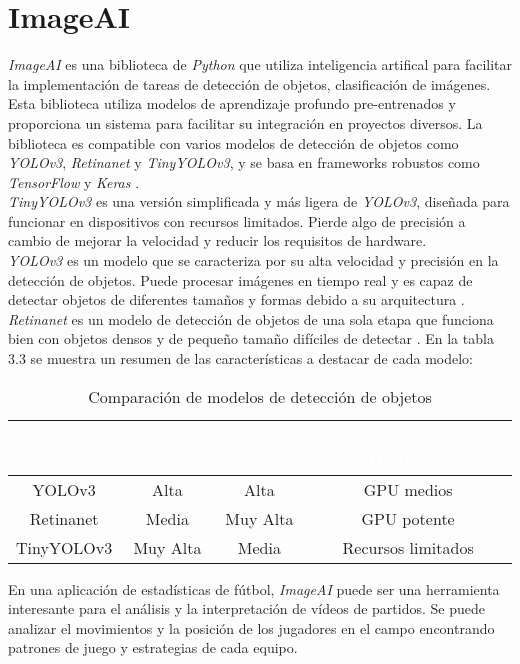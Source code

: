 \section{ImageAI}

\textit{ImageAI} es una biblioteca de \textit{Python} que utiliza inteligencia artifical para facilitar la implementación de tareas de detección de objetos, clasificación de imágenes. Esta biblioteca utiliza modelos de aprendizaje profundo pre-entrenados y proporciona un sistema para facilitar su integración en proyectos diversos. La biblioteca es compatible con varios modelos de detección de objetos como \textit{YOLOv3}, \textit{Retinanet} y \textit{TinyYOLOv3}, y se basa en frameworks robustos como \textit{TensorFlow} y \textit{Keras} \cite{imageAI:latex}. \\
\textit{TinyYOLOv3} es una versión simplificada y más ligera de \textit{YOLOv3}, diseñada para funcionar en dispositivos con recursos limitados. Pierde algo de precisión a cambio de mejorar la velocidad y reducir los requisitos de hardware. \\
\textit{YOLOv3} es un modelo que se caracteriza por su alta velocidad y precisión en la detección de objetos. Puede procesar imágenes en tiempo real y es capaz de detectar objetos de diferentes tamaños y formas debido a su arquitectura \cite{yolo:latex}. \\
\textit{Retinanet} es un modelo de detección de objetos de una sola etapa que funciona bien con objetos densos y de pequeño tamaño difíciles de detectar \cite{retinanet:latex}.
En la tabla 3.3 se muestra un resumen de las características a destacar de cada modelo:

\begin{table}[h]
\centering
\begin{tabular}{|c|c|c|c|}
\hline
\rowcolor{black} 
\textcolor{white}{\textbf{Modelo}} & \textcolor{white}{\textbf{Velocidad}} & \textcolor{white}{\textbf{Precisión}} & \textcolor{white}{\textbf{Requisitos de Hardware}} \\ 
\hline
YOLOv3 & Alta & Alta & GPU medios \\ 
\hline
Retinanet & Media & Muy Alta & GPU potente \\ 
\hline
TinyYOLOv3 & Muy Alta & Media & Recursos limitados \\ 
\hline
\end{tabular}
\caption{Comparación de modelos de detección de objetos}
\label{table:model_comparison}
\end{table}

En una aplicación de estadísticas de fútbol, \textit{ImageAI} puede ser una herramienta interesante para el análisis y la interpretación de vídeos de partidos. Se puede analizar el movimientos y la posición de los jugadores en el campo encontrando patrones de juego y estrategias de cada equipo. \\

